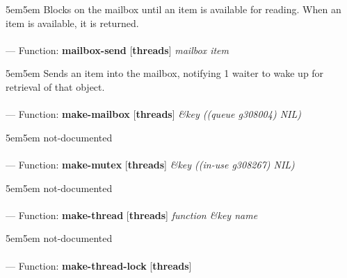 \begin{adjustwidth}{5em}{5em}
Blocks on the mailbox until an item is available for reading.
When an item is available, it is returned.
\end{adjustwidth}

\paragraph{}
\label{THREADS:MAILBOX-SEND}
--- Function: \textbf{mailbox-send} [\textbf{threads}] \textit{mailbox item}

\begin{adjustwidth}{5em}{5em}
Sends an item into the mailbox, notifying 1 waiter
to wake up for retrieval of that object.
\end{adjustwidth}

\paragraph{}
\label{THREADS:MAKE-MAILBOX}
--- Function: \textbf{make-mailbox} [\textbf{threads}] \textit{\&key ((queue g308004) NIL)}

\begin{adjustwidth}{5em}{5em}
not-documented
\end{adjustwidth}

\paragraph{}
\label{THREADS:MAKE-MUTEX}
--- Function: \textbf{make-mutex} [\textbf{threads}] \textit{\&key ((in-use g308267) NIL)}

\begin{adjustwidth}{5em}{5em}
not-documented
\end{adjustwidth}

\paragraph{}
\label{THREADS:MAKE-THREAD}
--- Function: \textbf{make-thread} [\textbf{threads}] \textit{function \&key name}

\begin{adjustwidth}{5em}{5em}
not-documented
\end{adjustwidth}

\paragraph{}
\label{THREADS:MAKE-THREAD-LOCK}
--- Function: \textbf{make-thread-lock} [\textbf{threads}] \textit{}

